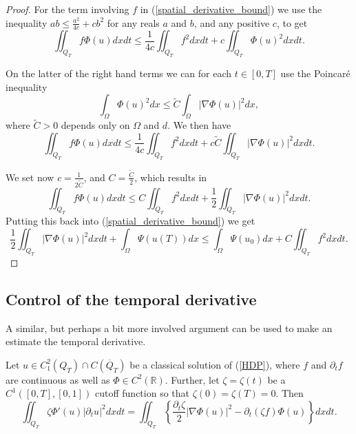 \documentclass[11pt, a4paper]{article}
\begin{document}
\begin{proof}
For the term involving $f$ in (\ref{spatial_derivative_bound}) we use the inequality $ab \leq \frac{a^2}{4c} + cb^2$ for any reals $a$ and $b$, and any positive $c$, to get
\begin{equation*}
\iint_{Q_T}f\Phi(u) dxdt \leq \frac{1}{4c}\iint_{Q_T}f^2dxdt + c\iint_{Q_T}\Phi(u)^2 dxdt.
\end{equation*}

On the latter of the right hand terms we can for each $t \in [0,T]$ use the Poincaré inequality
\begin{equation*}
\int_\Omega \Phi(u)^2 dx \leq \tilde{C}\int_\Omega |\nabla \Phi(u) |^2 dx,
\end{equation*}
where $\tilde{C}>0$ depends only on $\Omega$ and $d$. We then have
\begin{equation*}
\iint_{Q_T} f\Phi(u)dxdt \leq \frac{1}{4c}\iint_{Q_T}f^2dxdt + c\tilde{C}\iint_{Q_T}|\nabla \Phi(u)|^2dxdt. 
\end{equation*}

We set now $c = \frac{1}{2\tilde{C}}$, and $C= \frac{\tilde{C}}{2}$, which results in
\begin{equation*}
\iint_{Q_T}f\Phi(u)dxdt \leq C\iint_{Q_T}f^2dxdt + \frac{1}{2}\iint_{Q_T}|\nabla \Phi(u)|^2dxdt.
\end{equation*}
Putting this back into (\ref{spatial_derivative_bound}) we get
\begin{equation}
\frac{1}{2}\iint_{Q_T}|\nabla \Phi(u)|^2dxdt + \int_\Omega \Psi(u(T))dx \leq \int_\Omega \Psi(u_0)dx + C\iint_{Q_T}f^2dxdt.
\end{equation}
\end{proof}


\subsection{Control of the temporal derivative}
A similar, but perhaps a bit more involved argument can be used to make an estimate the temporal derivative.

\begin{lemma}
\label{lem:temporal_bound_classical}
Let $u\in C^2_1(Q_T) \cap C(\overline{Q}_T)$ be a classical solution of (\ref{HDP}), where $f$ and $\partial_tf$ are continuous as well as $\Phi \in C^2(\mathbb{R})$. Further, let $\zeta = \zeta(t)$ be a $C^1([0,T],[0,1])$ cutoff function so that $\zeta(0) = \zeta(T) = 0$. Then
\begin{equation}
\label{temporal_bound_classical}
\iint_{Q_T} \zeta \Phi'(u) |\partial_t u|^2 dxdt = \iint_{Q_T} \left\{ \frac{\partial_t \zeta}{2}|\nabla \Phi(u)|^2 - \partial_t(\zeta f) \Phi(u) \right\} dxdt.
\end{equation}
\end{lemma}
\end{document}
